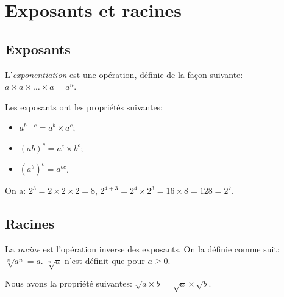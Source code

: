 \section{Exposants et racines}

\subsection{Exposants}\label{exposants}

\begin{definition}
    L'\emph{exponentiation} est une opération, définie de la façon suivante: $a \times a \times \dots \times a = a^n$.
\end{definition}

\begin{propriete}
    Les exposants ont les propriétés suivantes:
    \begin{itemize}
        \item $a^{b+c} = a^b \times a^c$;
        \item $(ab)^c = a^c \times b^c$;
        \item $(a^b)^c = a^{bc}$.
    \end{itemize}
\end{propriete}

\begin{exemple}
    On a: $2^3 = 2\times 2\times 2 = 8$, $2^{4 + 3} = 2^4 \times 2^3 = 16 \times 8 = 128 = 2^7$.
\end{exemple}

\subsection{Racines}

\begin{definition}
    La \emph{racine} est l'opération inverse des exposants. On la définie comme suit: $\sqrt[n]{a^n} = a$. $\sqrt[n]{a}$ n'est définit que pour $a\geq 0$.
\end{definition}

\begin{propriete}
    Nous avons la propriété suivantes: $\sqrt{a\times b} = \sqrt{a} \times \sqrt{b}$.
\end{propriete}